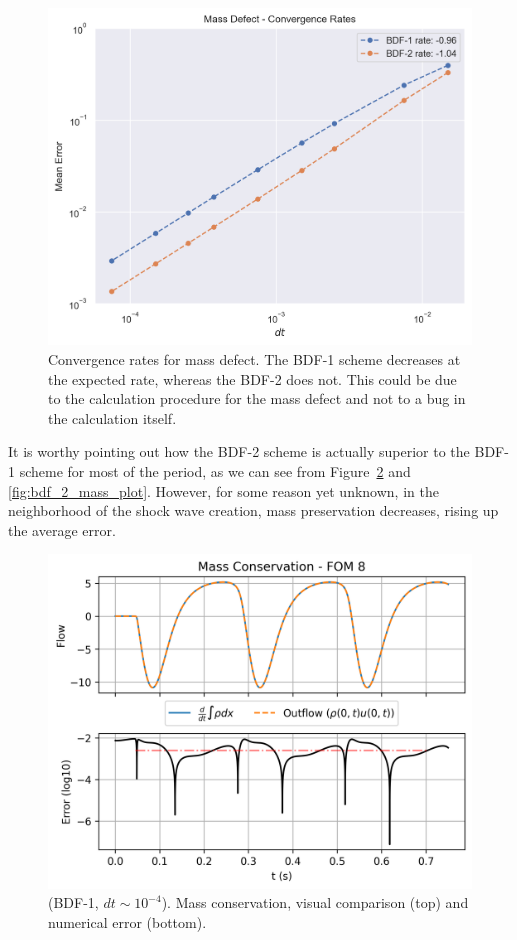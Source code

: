 \documentclass[../../thesis.tex]{subfiles}
\begin{document}
\begin{figure}[h]
    \centering
    \includegraphics[width=1\columnwidth]{research_project/piston/figures/bdf_convergence/convergence_rates_mass.png}
    \caption{Convergence rates for mass defect.
    The BDF-1 scheme decreases at the expected rate, whereas the BDF-2 does not.
    This could be due to the calculation procedure for the mass defect and not to a bug in the calculation itself.}
    \label{fig:bdf_convergence_mass}
\end{figure}
It is worthy pointing out how the BDF-2 scheme is actually superior to the BDF-1 scheme 
for most of the period, as we can see from Figure~\ref{fig:bdf_1_mass_plot} and \ref{fig:bdf_2_mass_plot}. 
However, for some reason yet unknown, in the neighborhood of the shock wave creation, mass preservation decreases,
rising up the average error.  
\begin{figure}[h]
    \centering
    \includegraphics[width=1\columnwidth]{research_project/piston/figures/bdf_convergence/mass_FOM_8_bdf_1.png}
    \caption{(BDF-1, $dt\sim 10^{-4}$).
    Mass conservation, visual comparison (top) and numerical error (bottom).}
    \label{fig:bdf_1_mass_plot}
\end{figure}
\end{document}

